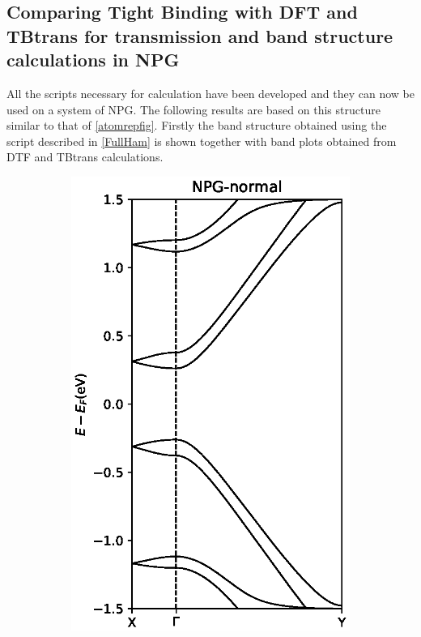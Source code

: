 \subsection{Comparing Tight Binding with DFT and TBtrans for transmission and band structure calculations in NPG}
All the scripts necessary for calculation have been developed and they can now be used on a system of NPG.
The following results are based on this structure similar to that of \cref{atomrepfig}. Firstly the band structure obtained using the script described in \cref{FullHam} is shown together with  band plots obtained from DTF and TBtrans calculations. 
\begin{figure}[H]
	\centering
	\begin{subfigure}[b]{0.5\textwidth}
		\includegraphics[width=\textwidth]{Figures/NPG-normalBandstructures.eps}

\end{subfigure}
\end{figure}
